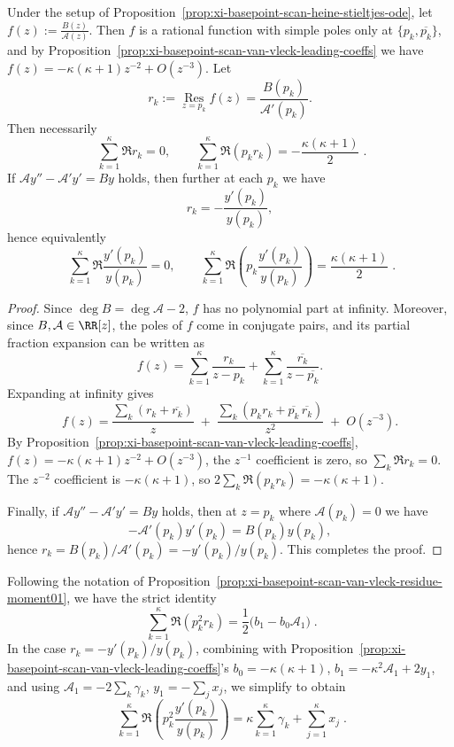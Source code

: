\begin{proposition}\label{prop:xi-basepoint-scan-van-vleck-residue-moment01}
Under the setup of Proposition~\ref{prop:xi-basepoint-scan-heine-stieltjes-ode}, let
\(
f(z):=\frac{B(z)}{\mathcal{A}(z)}
\).
Then \(f\) is a rational function with simple poles only at \(\{p_k,\overline{p_k}\}\), and by Proposition~\ref{prop:xi-basepoint-scan-van-vleck-leading-coeffs} we have
\(
f(z)=-\kappa(\kappa+1)z^{-2}+O(z^{-3})
\).
Let
\[
r_k:=\operatorname*{Res}_{z=p_k} f(z)=\frac{B(p_k)}{\mathcal{A}'(p_k)}.
\]
Then necessarily
\[
\boxed{\;
\sum_{k=1}^{\kappa}\Re r_k=0,\qquad
\sum_{k=1}^{\kappa}\Re(p_k r_k)=-\frac{\kappa(\kappa+1)}{2}\; }.
\]
If \(\mathcal{A}y''-\mathcal{A}'y'=By\) holds, then further at each \(p_k\) we have
\[
r_k=-\frac{y'(p_k)}{y(p_k)},
\]
hence equivalently
\[
\boxed{\;
\sum_{k=1}^{\kappa}\Re\frac{y'(p_k)}{y(p_k)}=0,\qquad
\sum_{k=1}^{\kappa}\Re\!\left(p_k\frac{y'(p_k)}{y(p_k)}\right)=\frac{\kappa(\kappa+1)}{2}\; }.
\]
\end{proposition}
\begin{proof}
Since \(\deg B=\deg\mathcal{A}-2\), \(f\) has no polynomial part at infinity.
Moreover, since \(B,\mathcal{A}\in\RR[z]\), the poles of \(f\) come in conjugate pairs, and its partial fraction expansion can be written as
\[
f(z)=\sum_{k=1}^{\kappa}\frac{r_k}{z-p_k}+\sum_{k=1}^{\kappa}\frac{\overline{r_k}}{z-\overline{p_k}}.
\]
Expanding at infinity gives
\[
f(z)=\frac{\sum_k(r_k+\overline{r_k})}{z}
\;+\;\frac{\sum_k(p_k r_k+\overline{p_k}\,\overline{r_k})}{z^2}
\;+\;O(z^{-3}).
\]
By Proposition~\ref{prop:xi-basepoint-scan-van-vleck-leading-coeffs},
\(
f(z)=-\kappa(\kappa+1)z^{-2}+O(z^{-3})
\), the \(z^{-1}\) coefficient is zero, so \(\sum_k\Re r_k=0\).
The \(z^{-2}\) coefficient is \(-\kappa(\kappa+1)\), so
\(
2\sum_k\Re(p_k r_k)=-\kappa(\kappa+1)
\).
\par
Finally, if \(\mathcal{A}y''-\mathcal{A}'y'=By\) holds, then at \(z=p_k\) where \(\mathcal{A}(p_k)=0\) we have
\[
-\mathcal{A}'(p_k)y'(p_k)=B(p_k)y(p_k),
\]
hence \(r_k=B(p_k)/\mathcal{A}'(p_k)=-y'(p_k)/y(p_k)\). This completes the proof.
\end{proof}
\begin{proposition}\label{prop:xi-basepoint-scan-van-vleck-residue-moment2}
Following the notation of Proposition~\ref{prop:xi-basepoint-scan-van-vleck-residue-moment01}, we have the strict identity
\[
\boxed{\;
\sum_{k=1}^{\kappa}\Re(p_k^{2} r_k)=\frac{1}{2}\bigl(b_1-b_0\mathcal{A}_1\bigr)\; }.
\]
In the case \(r_k=-y'(p_k)/y(p_k)\), combining with Proposition~\ref{prop:xi-basepoint-scan-van-vleck-leading-coeffs}'s
\(
b_0=-\kappa(\kappa+1)
\),
\(
b_1=-\kappa^{2}\mathcal{A}_1+2y_1
\),
and using \(\mathcal{A}_1=-2\sum_{k}\gamma_k\), \(y_1=-\sum_{j}x_j\), we simplify to obtain
\[
\boxed{\;
\sum_{k=1}^{\kappa}\Re\!\left(p_k^{2}\frac{y'(p_k)}{y(p_k)}\right)
=\kappa\sum_{k=1}^{\kappa}\gamma_k+\sum_{j=1}^{\kappa}x_j\; }.
\]
\end{proposition}
